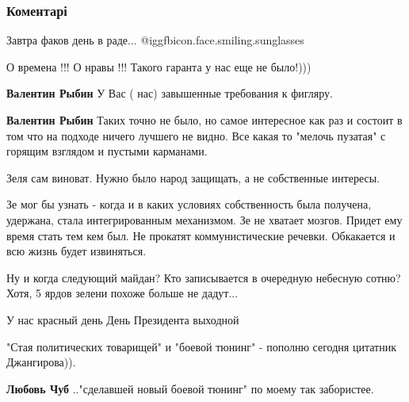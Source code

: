  
 
 
 
 
\subsubsection{Коментарі}

\begin{itemize} %
Завтра факов день в раде... @igg{fbicon.face.smiling.sunglasses} 

О времена !!! О нравы !!!
Такого гаранта у нас еще не было!)))

\begin{itemize} %
\textbf{Валентин Рыбин} У Вас ( нас) завышенные требования к фигляру.

\textbf{Валентин Рыбин} Таких точно не было, но самое интересное как раз и
состоит в том что на подходе ничего лучшего не видно. Все какая то "мелочь
пузатая" с горящим взглядом и пустыми карманами.
\end{itemize} %

Зеля сам виноват. Нужно было народ защищать, а не собственные интересы.


Зе мог бы узнать - когда и в каких условиях собственность была получена,
удержана, стала интегрированным механизмом. Зе не хватает мозгов. Придет ему
время стать тем кем был. Не прокатят коммунистические речевки. Обкакается и всю
жизнь будет извиняться.

Ну и когда следующий майдан? Кто записывается в очередную небесную сотню? Хотя, 5 ярдов зелени похоже больше не дадут...

У нас красный день День Президента выходной

"Стая политических товарищей" и "боевой тюнинг" - пополню сегодня цитатник Джангирова)).

\begin{itemize} %
\textbf{Любовь Чуб} .."сделавшей новый боевой тюнинг" по моему так забористее.


\end{itemize}
\end{itemize}
